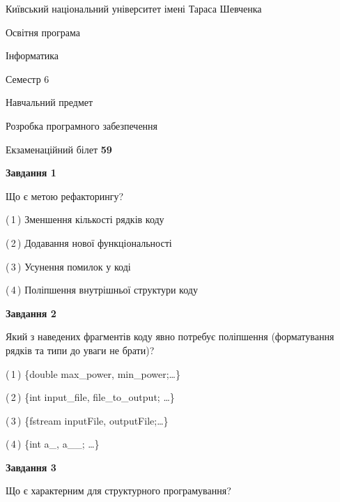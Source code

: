 \documentclass[10pt, ukrainian]{article}
\begin{document}
{{\begin {small}\par
{ \center  Київський національний університет імені Тараса Шевченка \par}
{\parbox {5 cm}{Освітня програма \hfill}{\parbox {7 cm}{Інформатика \hfill}}\parbox {6 cm}{\hfill Семестр 6}}\par
{\parbox {5 cm} {Навчальний предмет \hfill}\parbox {7 cm}{Розробка програмного забезпечення \hfill}\parbox {6cm}{\hfill}\par}\vspace{-7pt} \end{small}}{\center Екзаменаційний білет \No \textbf
{ 59 }\par}}
{
\begin {large}
{\begin {center}\textbf{Завдання 1}\end {center}}\par
Що є метою рефакторингу?\par
\vspace{2mm}



(\,1\,) Зменшення кількості рядків коду%



(\,2\,) Додавання нової функціональності%



(\,3\,) Усунення помилок у коді%



(\,4\,) Поліпшення внутрішньої структури коду%


{\begin {center}\textbf{Завдання 2}\end {center}}\par
Який з наведених фрагментів коду явно потребує поліпшення (форматування рядків та типи до уваги не брати)?\par
\vspace{2mm}



(\,1\,) \{double max\_power, min\_power;…\} %



(\,2\,) \{int input\_file, file\_to\_output; …\}%



(\,3\,) \{fstream inputFile, outputFile;…\} %



(\,4\,) \{int a\_, a\_\_; …\}%


{\begin {center}\textbf{Завдання 3}\end {center}}\par
Що є характерним для структурного програмування?\par
\vspace{2mm}




\end{large}}
\end{document}
